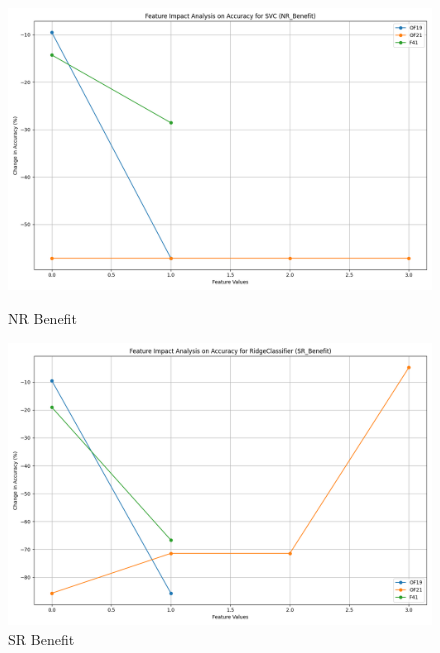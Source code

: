 \begin{figure}[H]
    \centering
    \begin{minipage}{0.495\textwidth}
        \centering
        \includegraphics[width=\linewidth]{analysis/images/feature_impact_accuracy_NR_Benefit_SVC.png}
        \caption{NR Benefit}
        \label{fig:nr_ben_accuracy_analysis}
    \end{minipage}\hfill
    \begin{minipage}{0.495\textwidth}
        \centering
        \includegraphics[width=\linewidth]{analysis/images/feature_impact_accuracy_SR_Benefit_RidgeClassifier.png}
        \caption{SR Benefit}
        \label{fig:sr_ben_accuracy_analysis}
    \end{minipage}
\end{figure}

